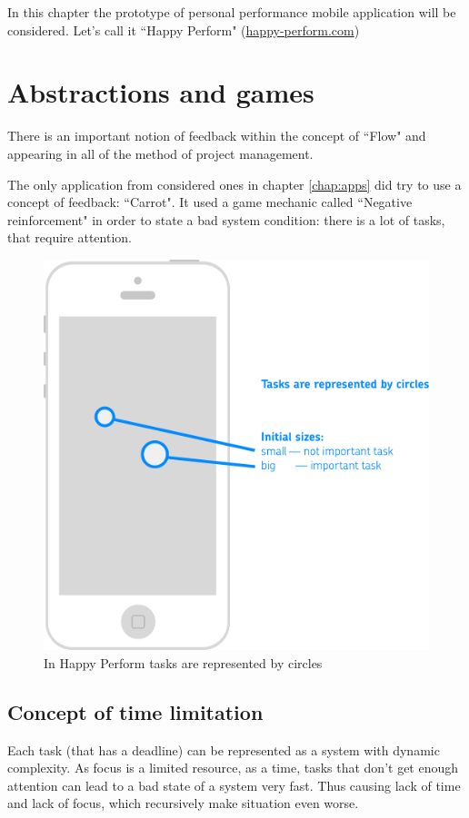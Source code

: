 In this chapter the prototype of personal performance mobile application will be considered. Let's call it ``Happy Perform" (\url{happy-perform.com})

\section{Abstractions and games}
There is an important notion of feedback within the concept of ``Flow" and appearing in all of the method of project management.

The only application from considered ones in chapter \ref{chap:apps} did try to use a concept of feedback: ``Carrot". It used a game mechanic called ``Negative reinforcement" in order to state a bad system condition: there is a lot of tasks, that require attention.

\begin{figure}
   \centering
	\includegraphics[width=0.8\linewidth]{resources/tasks.pdf}
	\caption[Happy Perform, tasks representation]{In Happy Perform tasks are represented by circles}
\end{figure}

\subsection{Concept of time limitation}

Each task (that has a deadline) can be represented as a system with dynamic complexity. As focus is a limited resource, as a time, tasks that don't get enough attention can lead to a bad state of a system very fast. Thus causing lack of time and lack of focus, which recursively make situation even worse.

